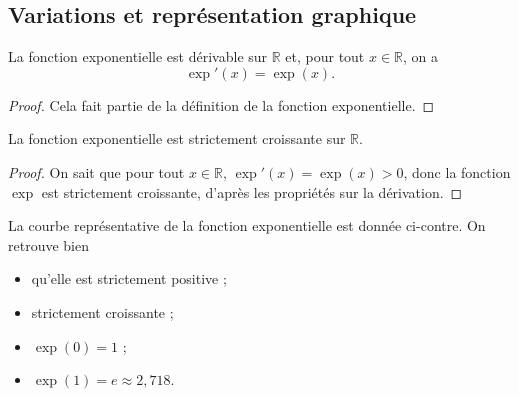 \documentclass[11pt]{article}
\begin{document}
\subsection{Variations et représentation graphique}
\begin{prop}
  La fonction exponentielle est dérivable sur $\mathbb{R}$ et, pour tout
  $x\in\mathbb{R}$, on a
  \[
    \exp'(x) = \exp(x).
  \]
\end{prop}
\begin{proof}
  Cela fait partie de la définition de la fonction exponentielle.
\end{proof}
\begin{prop}
  La fonction exponentielle est strictement croissante sur
  $\mathbb{R}$.\\[-3mm]
\begin{center}
\end{center}
\end{prop}
\begin{proof}
  On sait que pour tout $x\in\mathbb{R}$, $\exp'(x)=\exp(x)>0$, donc la fonction
  $\exp$ est strictement croissante, d'après les propriétés sur la dérivation.
\end{proof}
\begin{prop}
  \begin{minipage}[]{.5\textwidth}
    La courbe représentative de la fonction exponentielle est donnée ci-contre.
    On retrouve bien
    \begin{itemize}
      \item qu'elle est strictement positive ;
      \item strictement croissante ;
      \item $\exp(0)=1$ ;
      \item $\exp(1)=e\approx2,718$.
    \end{itemize}
  \end{minipage}
  \begin{minipage}[]{.5\textwidth}
  \begin{center}
  \end{center}
  \end{minipage}
\end{prop}
\end{document}
